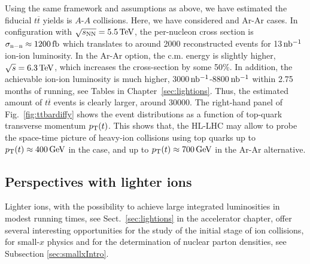 \documentclass[../report.tex]{subfiles}
\begin{document}
Using the same framework and assumptions as above, we have estimated the fiducial $t\overline{t}$ yields is $A$-$A$ collisions. Here, we have considered \PbPb and Ar-Ar cases. In \PbPb configuration with $\sqrt{s_{\rm NN}} = 5.5 \, {\rm TeV}$, the per-nucleon cross section is $\sigma_{\rm n-n} \approx 1200 \, {\rm fb}$ which translates to around 2000 reconstructed events for 13$\, \rm nb^{-1}$ ion-ion luminosity. In the Ar-Ar option, the c.m. energy is slightly higher, $\sqrt{s} = 6.3 \, {\rm TeV}$, which increases the cross-section by some 50\%. In addition, the achievable ion-ion luminosity is much higher, 3000$\,\rm nb^{-1}$-8800$\,\rm nb^{-1}$ within 2.75 months of running, see Tables in Chapter~\ref{sec:lightions}. %
Thus, the estimated amount of $t\overline{t}$ events is clearly larger, around 30000. The right-hand panel of Fig.~\ref{fig:ttbardiffy} shows the event distributions as a function of top-quark transverse momentum $p\sb{\scriptstyle\mathrm{T}}(t)$. This shows that, the HL-LHC may allow to probe the space-time picture of heavy-ion collisions using top quarks \cite{Apolinario:2017sob} up to $p_{\rm T}(t) \approx 400\,{\rm GeV}$ in the \PbPb case, and up to $p_{\rm T}(t) \approx 700\,{\rm GeV}$ in the Ar-Ar alternative. \\






\subsection{Perspectives with lighter ions}
\label{sec:nPDF_lightions}
Lighter ions, with the possibility to achieve large integrated luminosities in modest running times, see Sect.~\ref{sec:lightions} in the accelerator chapter, offer several interesting opportunities for the study of the initial stage of ion collisions, for small-$x$ physics and for the determination of nuclear parton densities, see Subsection \ref{sec:smallxIntro}.
\end{document}
